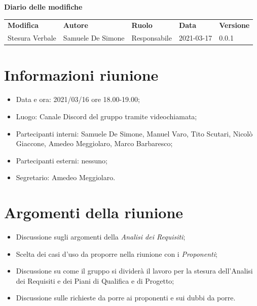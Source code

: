 \documentclass[a4paper]{article}
\begin{document}
    \begin{center}
        \textbf{\Large Diario delle modifiche}\\
        \vspace{10px}
        \begin{table}[h!]
        \centering
        \renewcommand{\arraystretch}{1.8}
        \begin{tabular}{p{150px} p{90px} p{60px} p{60px} p{45px}}
            \rowcolor{logo!70} \textbf{Modifica} & \textbf{Autore} & \textbf{Ruolo} & \textbf{Data} & \textbf{Versione}\\
            Stesura Verbale & Samuele De Simone & Responsabile & 2021-03-17 & 0.0.1 \\    
        \end{tabular}
    \end{table}
    \end{center}

    \newpage
    \tableofcontents
    \newpage
    \section{Informazioni riunione}
    \begin{itemize}
        \item Data e ora: 2021/03/16 ore 18.00-19.00;
        \item Luogo: Canale Discord del gruppo tramite videochiamata;
        \item Partecipanti interni: Samuele De Simone, Manuel Varo, Tito Scutari, Nicolò Giaccone, Amedeo Meggiolaro, Marco Barbaresco;
        \item Partecipanti esterni: nessuno;
        \item Segretario: Amedeo Meggiolaro.
    \end{itemize}
    \section{Argomenti della riunione}
    \begin{itemize}
        \item Discussione sugli argomenti della \textit{Analisi dei Requisiti};
        \item Scelta dei casi d'uso da proporre nella riunione con i \textit{Proponenti};
        \item Discussione su come il gruppo si dividerà il lavoro per la stesura dell'Analisi dei Requisiti e dei Piani di Qualifica e di Progetto;
        \item Discussione sulle richieste da porre ai proponenti e sui dubbi da porre.
    \end{itemize}
\end{document}
